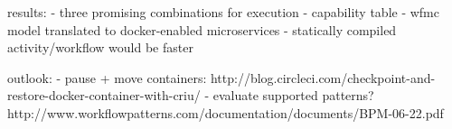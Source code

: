 
results:
  - three promising combinations for execution
  - capability table
  - wfmc model translated to docker-enabled microservices
  - statically compiled activity/workflow would be faster

outlook:
  - pause + move containers: http://blog.circleci.com/checkpoint-and-restore-docker-container-with-criu/
  - evaluate supported patterns?  http://www.workflowpatterns.com/documentation/documents/BPM-06-22.pdf
